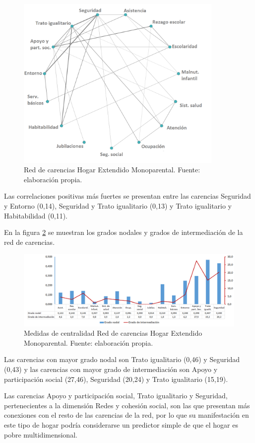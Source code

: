 \documentclass[12pt,letterpaper,spanish]{article}
\begin{document}
\begin{figure}[H]
  \centering
    \includegraphics[width=10cm]{Grafos/grafo_monoex_pos.png}
    \caption{Red de carencias Hogar Extendido Monoparental. Fuente: elaboración propia.}
    \label{RedMonoexpos}
\end{figure}
Las correlaciones positivas más fuertes se presentan entre las carencias Seguridad y Entorno (0,14), Seguridad y Trato igualitario (0,13) y Trato igualitario y Habitabilidad (0,11). 

En la figura \ref{CenMonoex} se muestran los grados nodales y grados de intermediación de la red de carencias.

\begin{figure}[H]
    \centering
    \includegraphics[width=\textwidth]{Grafos/nc_monoex.png}
    \caption{Medidas de centralidad Red de carencias Hogar Extendido Monoparental. Fuente: elaboración propia.}
    \label{CenMonoex}
\end{figure}
Las carencias con mayor grado nodal son Trato igualitario (0,46) y Seguridad (0,43) y las carencias con mayor grado de intermediación son Apoyo y participación social (27,46), Seguridad (20,24) y Trato igualitario (15,19).

Las carencias Apoyo y participación social, Trato igualitario y Seguridad, pertenecientes a la dimensión Redes y cohesión social, son las que presentan más conexiones con el resto de las carencias de la red, por lo que su manifestación en este tipo de hogar podría considerarse un predictor simple de que el hogar es pobre multidimensional.
\end{document}
